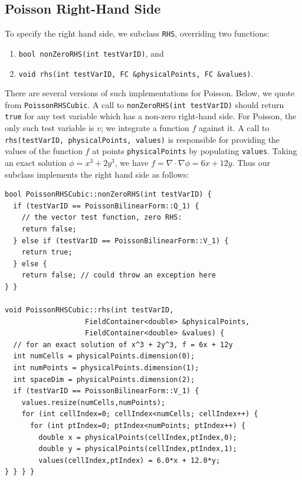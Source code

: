 \subsection{Poisson Right-Hand Side}\label{NVR:sec:poissonRHS}
To specify the right hand side, we subclass \verb=RHS=, overriding two functions:
\begin{enumerate}
\item \verb=bool nonZeroRHS(int testVarID)=, and
\item \verb=void rhs(int testVarID, FC &physicalPoints, FC &values)=.
\end{enumerate}

There are several versions of such implementations for Poisson.  Below, we quote from \verb=PoissonRHSCubic=.  A call to \verb=nonZeroRHS(int testVarID)= should return \verb=true= for any test variable which has a non-zero right-hand side.  For Poisson, the only such test variable is $v$; we integrate a function $f$ against it.  A call to
\verb=rhs(testVarID, physicalPoints, values)=
is responsible for providing the values of the function $f$ at points \verb=physicalPoints= by populating \verb=values=.  Taking an exact solution $\phi=x^{3}+2y^{3}$, we have $f=\nabla \cdot \nabla \phi = 6x+12y$.  Thus our subclass implements the right hand side as follows:
\begin{lstlisting}
bool PoissonRHSCubic::nonZeroRHS(int testVarID) {
  if (testVarID == PoissonBilinearForm::Q_1) { 
    // the vector test function, zero RHS:
    return false;
  } else if (testVarID == PoissonBilinearForm::V_1) {
    return true;
  } else {
    return false; // could throw an exception here
} }

void PoissonRHSCubic::rhs(int testVarID, 
                   FieldContainer<double> &physicalPoints,
                   FieldContainer<double> &values) {
  // for an exact solution of x^3 + 2y^3, f = 6x + 12y
  int numCells = physicalPoints.dimension(0);
  int numPoints = physicalPoints.dimension(1);
  int spaceDim = physicalPoints.dimension(2);
  if (testVarID == PoissonBilinearForm::V_1) {
    values.resize(numCells,numPoints);
    for (int cellIndex=0; cellIndex<numCells; cellIndex++) {
      for (int ptIndex=0; ptIndex<numPoints; ptIndex++) {
        double x = physicalPoints(cellIndex,ptIndex,0);
        double y = physicalPoints(cellIndex,ptIndex,1);
        values(cellIndex,ptIndex) = 6.0*x + 12.0*y;
} } } }
\end{lstlisting}

